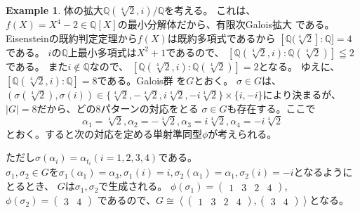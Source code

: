 \documentclass[dvipdfmx]{jsarticle}
\theoremstyle{definition}
\newtheorem{example}[definition]{Example}
\begin{document}
\begin{example}\label{ex1}
  体の拡大$\mathbb{Q}(\sqrt[4]{2},i)/\mathbb{Q}$を考える。
  これは、$f(X)=X^4-2\in \mathbb{Q}[X]$の最小分解体だから、有限次Galois拡大
  である。Eisensteinの既約判定定理から$f(X)$は既約多項式であるから
  $[\mathbb{Q}(\sqrt[4]{2}]:\mathbb{Q}]=4$である。
  $i$の$\mathbb{Q}$上最小多項式は$X^2+1$であるので、
  $[\mathbb{Q}(\sqrt[4]{2},i):\mathbb{Q}(\sqrt[4]{2})]\leqq 2$である。
  また$i\not\in\mathbb{Q}$なので、
  $[\mathbb{Q}(\sqrt[4]{2},i):\mathbb{Q}(\sqrt[4]{2})]=2$となる。
  ゆえに、$[\mathbb{Q}(\sqrt[4]{2},i):\mathbb{Q}]=8$である。Galois群
  を$G$とおく。
  $\sigma\in G$は、
  $(\sigma(\sqrt[4]{2}),\sigma(i))\in
  \{\sqrt[4]{2},-\sqrt[4]{2},i\sqrt[4]{2},-i\sqrt[4]{2}\}\times 
  \{i,-i\}$により決まるが、$|G|=8$だから、どの8パターンの対応をとる
  $\sigma\in G$も存在する。ここで
  \[\alpha _1=\sqrt[4]{2},\alpha _2=-\sqrt[4]{2},
  \alpha _3=i\sqrt[4]{2},\alpha_4=-i\sqrt[4]{2}\]
  とおく。すると次の対応を定める単射準同型$\phi$が考えられる。
  \begin{center}
  \end{center}
 
ただし$\sigma(\alpha_i)=\alpha_{t_i}(i=1,2,3,4)$である。\\
$\sigma_1,\sigma_2\in G$を$\sigma_1(\alpha_1)=\alpha_3,\sigma_1(i)=i,
\sigma_2(\alpha_1)=\alpha_1,\sigma_2(i)=-i$となるようにとるとき、
$G$は$\sigma_1,\sigma_2$で生成される。
$\phi(\sigma_1)=\begin{pmatrix}1&3&2&4\end{pmatrix}$,
$\phi(\sigma_2)=\begin{pmatrix}3&4\end{pmatrix}$
であるので、$G\cong  \left\langle 
  \begin{pmatrix}1&3&2&4\end{pmatrix},
  \begin{pmatrix}3&4\end{pmatrix}
\right\rangle $となる。
\end{example}
\end{document}
